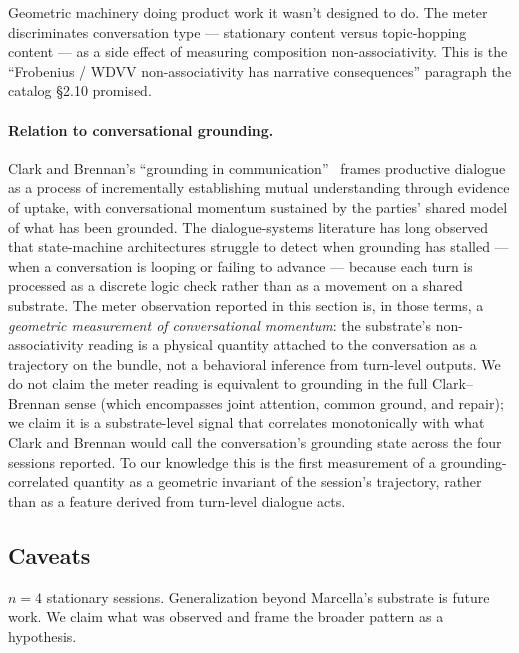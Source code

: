 \documentclass[11pt,letterpaper]{article}
\begin{document}
Geometric machinery doing product work it wasn't designed to do. The
meter discriminates conversation type --- stationary content versus
topic-hopping content --- as a side effect of measuring composition
non-associativity. This is the ``Frobenius / WDVV non-associativity
has narrative consequences'' paragraph the catalog \S2.10 promised.

\paragraph{Relation to conversational grounding.}
Clark and Brennan's ``grounding in
communication''~\cite{clarkbrennan1991grounding} frames productive
dialogue as a process of incrementally establishing mutual
understanding through evidence of uptake, with conversational
momentum sustained by the parties' shared model of what has been
grounded. The dialogue-systems literature has long observed that
state-machine architectures struggle to detect when grounding has
stalled --- when a conversation is looping or failing to advance
--- because each turn is processed as a discrete logic check
rather than as a movement on a shared substrate. The meter
observation reported in this section is, in those terms, a
\emph{geometric measurement of conversational momentum}: the
substrate's non-associativity reading is a physical quantity
attached to the conversation as a trajectory on the bundle, not a
behavioral inference from turn-level outputs. We do not claim the
meter reading is equivalent to grounding in the full
Clark--Brennan sense (which encompasses joint attention, common
ground, and repair); we claim it is a substrate-level signal that
correlates monotonically with what Clark and Brennan would call
the conversation's grounding state across the four sessions
reported. To our knowledge this is the first measurement of a
grounding-correlated quantity as a geometric invariant of the
session's trajectory, rather than as a feature derived from
turn-level dialogue acts.

\subsection{Caveats}

$n = 4$ stationary sessions. Generalization beyond Marcella's
substrate is future work. We claim what was observed and frame the
broader pattern as a hypothesis.
\end{document}
